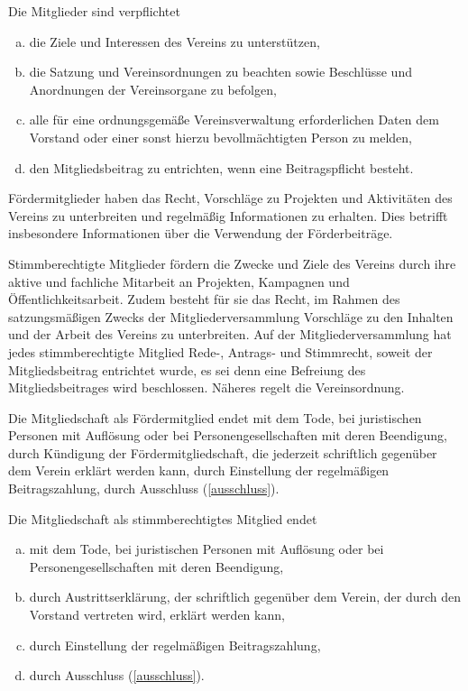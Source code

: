 \begin{contract}

    Die Mitglieder sind verpflichtet
    \begin{enumerate}[(a)]
        \item die Ziele und Interessen des Vereins zu unterstützen,
        \item die Satzung und Vereinsordnungen zu beachten sowie Beschlüsse und Anordnungen der Vereinsorgane zu befolgen,
        \item alle für eine ordnungsgemäße Vereinsverwaltung erforderlichen Daten dem Vorstand oder einer sonst hierzu bevollmächtigten Person zu melden,
        \item den Mitgliedsbeitrag zu entrichten, wenn eine Beitragspflicht besteht.
    \end{enumerate}

    Fördermitglieder haben das Recht, Vorschläge zu Projekten und Aktivitäten des Vereins zu unterbreiten und regelmäßig Informationen zu erhalten. Dies betrifft insbesondere Informationen über die Verwendung der Förderbeiträge.

    Stimmberechtigte Mitglieder fördern die Zwecke und Ziele des Vereins durch ihre aktive und fachliche Mitarbeit an Projekten, Kampagnen und Öffentlichkeitsarbeit. Zudem besteht für sie das Recht, im Rahmen des satzungsmäßigen Zwecks der Mitgliederversammlung Vorschläge zu den Inhalten und der Arbeit des Vereins zu unterbreiten. Auf der Mitgliederversammlung hat jedes stimmberechtigte Mitglied Rede-, Antrags- und Stimmrecht, soweit der Mitgliedsbeitrag entrichtet wurde, es sei denn eine Befreiung des Mitgliedsbeitrages wird beschlossen. Näheres regelt die Vereinsordnung.


    Die Mitgliedschaft als Fördermitglied endet
    mit dem Tode, bei juristischen Personen mit Auflösung oder bei Personengesellschaften mit deren Beendigung,
    durch Kündigung der Fördermitgliedschaft, die jederzeit schriftlich gegenüber dem Verein erklärt werden kann,
    durch Einstellung der regelmäßigen Beitragszahlung,
    durch Ausschluss (\ref{ausschluss}).

    Die Mitgliedschaft als stimmberechtigtes Mitglied endet
    \begin{enumerate}[(a)]
        \item mit dem Tode, bei juristischen Personen mit Auflösung oder bei Personengesellschaften mit deren Beendigung,
        \item durch Austrittserklärung, der schriftlich gegenüber dem Verein, der durch den Vorstand vertreten wird, erklärt werden kann,
        \item durch Einstellung der regelmäßigen Beitragszahlung,
        \item durch Ausschluss (\ref{ausschluss}).
    \end{enumerate}


\end{contract}

